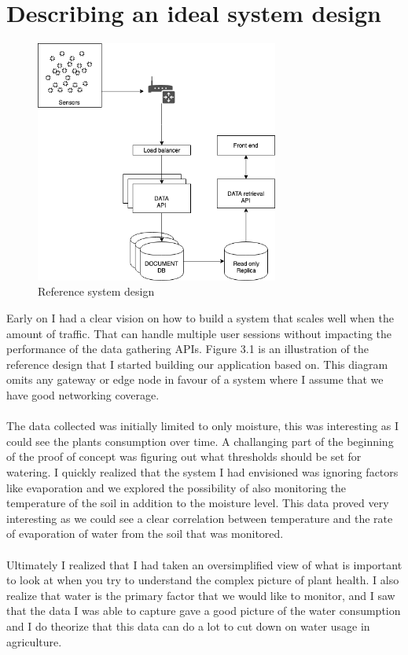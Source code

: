 \documentclass[]{uiophd}
\begin{document}
\section{Describing an ideal system design}
\begin{figure}[h]
\caption{Reference system design}
\centering
\includegraphics[width=8cm]{ideal_system_design.png}

\end{figure}
Early on I had a clear vision on how to build a system that scales well when the amount of traffic. That can handle multiple user sessions without impacting the performance of the data gathering APIs. Figure 3.1 is an illustration of the reference design that I started building our application based on. This diagram omits any gateway or edge node in favour of a system where I assume that we have good networking coverage.
\\\\
The data collected was initially limited to only moisture, this was interesting as I could see the plants consumption over time. A challanging part of the beginning of the proof of concept was figuring out what thresholds should be set for watering. I quickly realized that the system I had envisioned was ignoring factors like evaporation and we explored the possibility of also monitoring the temperature of the soil in addition to the moisture level. This data proved very interesting as we could see a clear correlation between temperature and the rate of evaporation of water from the soil that was monitored.
\\\\
Ultimately I realized that I had taken an oversimplified view of what is important to look at when you try to understand the complex picture of plant health. I also realize that water is the primary factor that we would like to monitor, and I saw that the data I was able to capture gave a good picture of the water consumption and I do theorize that this data can do a lot to cut down on water usage in agriculture.
\end{document}
